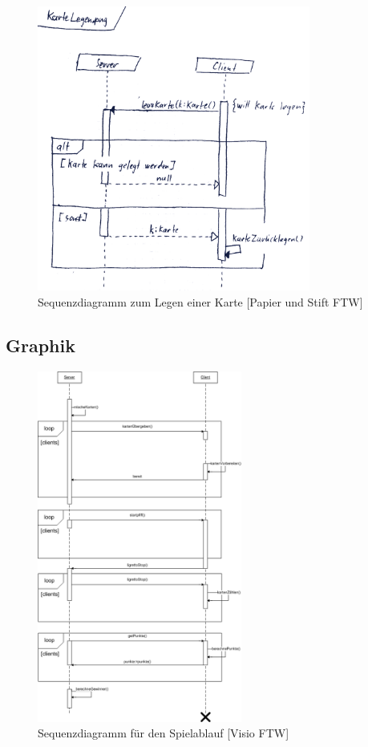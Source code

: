 \begin{figure}[hbt]
  \centering
  \includegraphics[width=0.80\textwidth,angle=0]{graphics/KarteLegen.png}
  \caption{Sequenzdiagramm zum Legen einer Karte [Papier und Stift FTW] \hfill{} }
 \end{figure}
 
 \subsection{Graphik}
 \begin{figure}[hbt]
  \centering
  \includegraphics[width=0.60\textwidth,angle=0]{graphics/Spielablauf_Sequenzdiagramm.png}
  \caption{Sequenzdiagramm für den Spielablauf [Visio FTW] \hfill{} }
 \end{figure}

